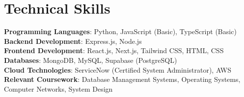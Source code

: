\documentclass[letterpaper,11pt]{article}
\begin{document}
\section{Technical Skills}
 \begin{itemize}[leftmargin=0.15in, label={}]
    \small{\item{
     \textbf{Programming Languages}{: Python, JavaScript (Basic), TypeScript (Basic)} \\
     \textbf{Backend Development}{: Express.js, Node.js} \\
     \textbf{Frontend Development}{: React.js, Next.js, Tailwind CSS, HTML, CSS} \\
     \textbf{Databases}{: MongoDB, MySQL, Supabase (PostgreSQL)} \\
     \textbf{Cloud Technologies}{: ServiceNow (Certified System Administrator), AWS} \\
     \textbf{Relevant Coursework}{: Database Management Systems, Operating Systems, Computer Networks, System Design}
    }}
 \end{itemize}
\end{document}
